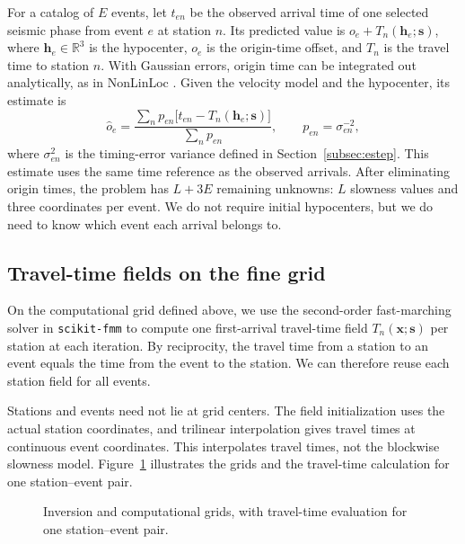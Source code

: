 \documentclass[12pt, a4paper]{article}
\begin{document}
For a catalog of $E$ events, let $t_{en}$ be the observed arrival time of one selected seismic phase from event $e$ at station $n$. Its predicted value is $o_e+T_n(\mathbf{h}_e;\mathbf{s})$, where $\mathbf{h}_e\in\mathbb{R}^3$ is the hypocenter, $o_e$ is the origin-time offset, and $T_n$ is the travel time to station $n$. With Gaussian errors, origin time can be integrated out analytically, as in NonLinLoc \parencite{lomax2000}. Given the velocity model and the hypocenter, its estimate is
\begin{equation}
\widehat{o}_e=\frac{\sum_n p_{en}\bigl[t_{en}-T_n(\mathbf{h}_e;\mathbf{s})\bigr]}{\sum_n p_{en}},
\qquad p_{en}=\sigma_{en}^{-2},
\label{eq:origin_time_estimate}
\end{equation}
where $\sigma_{en}^2$ is the timing-error variance defined in Section~\ref{subsec:estep}. This estimate uses the same time reference as the observed arrivals. After eliminating origin times, the problem has $L+3E$ remaining unknowns: $L$ slowness values and three coordinates per event. We do not require initial hypocenters, but we do need to know which event each arrival belongs to.

\subsection{Travel-time fields on the fine grid}
\label{subsec:forward}

On the computational grid defined above, we use the second-order fast-marching solver in \texttt{scikit-fmm} \parencite{scikitfmm} to compute one first-arrival travel-time field $T_n(\mathbf{x};\mathbf{s})$ per station at each iteration. By reciprocity, the travel time from a station to an event equals the time from the event to the station. We can therefore reuse each station field for all events.

Stations and events need not lie at grid centers. The field initialization uses the actual station coordinates, and trilinear interpolation gives travel times at continuous event coordinates. This interpolates travel times, not the blockwise slowness model. Figure~\ref{fig:forward_grids} illustrates the grids and the travel-time calculation for one station--event pair.

\begin{figure}[tbp]
\centering
{}
\caption{Inversion and computational grids, with travel-time evaluation for one station--event pair.}
\label{fig:forward_grids}
\end{figure}
\end{document}
